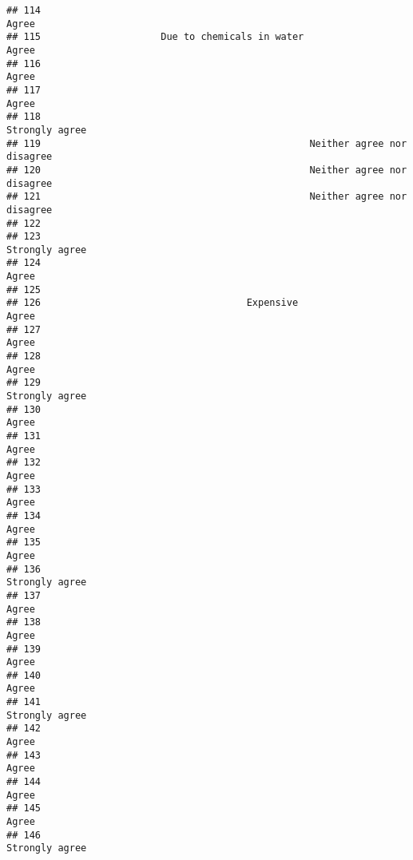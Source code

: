 \documentclass[
]{article}
\begin{document}
\begin{verbatim}
## 114                                                                    Agree
## 115                     Due to chemicals in water                      Agree
## 116                                                                    Agree
## 117                                                                    Agree
## 118                                                           Strongly agree
## 119                                               Neither agree nor disagree
## 120                                               Neither agree nor disagree
## 121                                               Neither agree nor disagree
## 122                                                                         
## 123                                                           Strongly agree
## 124                                                                    Agree
## 125                                                                         
## 126                                    Expensive                       Agree
## 127                                                                    Agree
## 128                                                                    Agree
## 129                                                           Strongly agree
## 130                                                                    Agree
## 131                                                                    Agree
## 132                                                                    Agree
## 133                                                                    Agree
## 134                                                                    Agree
## 135                                                                    Agree
## 136                                                           Strongly agree
## 137                                                                    Agree
## 138                                                                    Agree
## 139                                                                    Agree
## 140                                                                    Agree
## 141                                                           Strongly agree
## 142                                                                    Agree
## 143                                                                    Agree
## 144                                                                    Agree
## 145                                                                    Agree
## 146                                                           Strongly agree

\end{verbatim}
\end{document}
